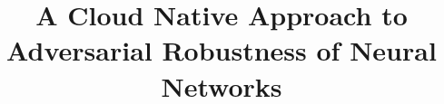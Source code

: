 \documentclass[journal]{IEEEtran}
\begin{document}
%
\title{A Cloud Native Approach to Adversarial Robustness of Neural Networks}




% 
\end{document}
